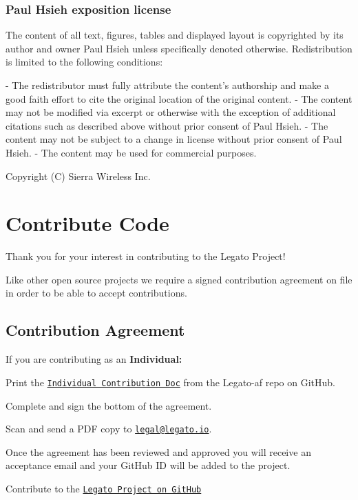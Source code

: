 \hypertarget{aboutLicensesOSL_licenseOSPHel}{}\subsubsection{Paul Hsieh exposition license}\label{aboutLicensesOSL_licenseOSPHel}
\begin{DoxyVerb}The content of all text, figures, tables and displayed layout is copyrighted by its
author and owner Paul Hsieh unless specifically denoted otherwise. Redistribution is
limited to the following conditions:

- The redistributor must fully attribute the content's authorship and make a good
  faith effort to cite the original location of the original content.
- The content may not be modified via excerpt or otherwise with the exception of
  additional citations such as described above without prior consent of Paul Hsieh.
- The content may not be subject to a change in license without prior consent of
  Paul Hsieh.
- The content may be used for commercial purposes.
\end{DoxyVerb}


Copyright (C) Sierra Wireless Inc. \hypertarget{aboutLegatoContributing}{}\section{Contribute Code}\label{aboutLegatoContributing}
Thank you for your interest in contributing to the Legato Project!

Like other open source projects we require a signed contribution agreement on file in order to be able to accept contributions.\hypertarget{aboutLegatoContributing_aboutLegatoContributing_agreement}{}\subsection{Contribution Agreement}\label{aboutLegatoContributing_aboutLegatoContributing_agreement}
If you are contributing as an {\bfseries Individual\+:} 


\begin{DoxyEnumerate}
\item Print the \href{https://github.com/legatoproject/legato-af/blob/master/CONTRIB_INDIVIDUAL.md}{\tt Individual Contribution Doc} from the Legato-\/af repo on Git\+Hub.
\item Complete and sign the bottom of the agreement.
\item Scan and send a P\+DF copy to \href{mailto:legal@legato.io}{\tt legal@legato.\+io}.
\item Once the agreement has been reviewed and approved you will receive an acceptance email and your Git\+Hub ID will be added to the project.
\item Contribute to the \href{https://github.com/legatoproject/}{\tt Legato Project on Git\+Hub}
\end{DoxyEnumerate}

